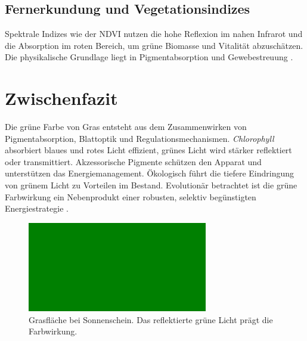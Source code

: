 \subsection{Fernerkundung und Vegetationsindizes}
Spektrale Indizes wie der NDVI nutzen die hohe Reflexion im nahen Infrarot und die Absorption im roten Bereich, um grüne Biomasse und Vitalität abzuschätzen. Die physikalische Grundlage liegt in Pigmentabsorption und Gewebestreuung \parencite{meyer2018photosynthese}.

\section{Zwischenfazit}
Die grüne Farbe von Gras entsteht aus dem Zusammenwirken von Pigmentabsorption, Blattoptik und Regulationsmechanismen. \textit{Chlorophyll} absorbiert blaues und rotes Licht effizient, grünes Licht wird stärker reflektiert oder transmittiert. Akzessorische Pigmente schützen den Apparat und unterstützen das Energiemanagement. Ökologisch führt die tiefere Eindringung von grünem Licht zu Vorteilen im Bestand. Evolutionär betrachtet ist die grüne Farbwirkung ein Nebenprodukt einer robusten, selektiv begünstigten Energiestrategie \parencite{meyer2018photosynthese, schmidt2015chlorophyll, zhao2012chlorophyll, gao2010lightabsorption, renoult2017evolution}.

\begin{figure}[h]
  \centering
  \includegraphics[width=0.7\textwidth]{bilder/gras.jpg}
  \caption{Grasfläche bei Sonnenschein. Das reflektierte grüne Licht prägt die Farbwirkung.}
  \label{fig:gras}
\end{figure}



